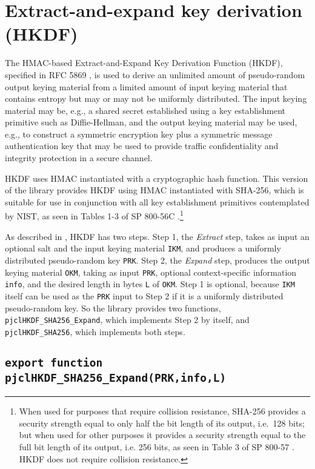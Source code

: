 \documentclass[12pt]{article}
\begin{document}
\section{Extract-and-expand key derivation (HKDF)} 

The HMAC-based Extract-and-Expand Key Derivation Function (HKDF),
specified in RFC 5869 \cite{RFC5869}, is used to derive an unlimited amount
of pseudo-random output keying material from a limited amount of input keying material 
that contains entropy but may or may not be uniformly distributed.  
The input keying material may be, e.g., a shared secret established using a key establishment
primitive such as Diffie-Hellman, and the output keying material may be used, e.g., 
to construct a symmetric encryption key plus a symmetric message authentication key
that may be used to provide traffic confidentiality and integrity protection in a secure channel.

HKDF uses HMAC instantiated with a cryptographic hash function.  This version of the library provides
HKDF using HMAC instantiated with SHA-256, which is suitable for use in conjunction with all key establishment primitives
contemplated by NIST, as seen in Tables 1-3 of SP 800-56C \cite{sp800-56C}.\footnote{When
used for purposes that require collision resistance, SHA-256 provides a security strength 
equal to only half the bit length of its output, i.e.\ 128 bits; but when used for other purposes it
provides a security strength equal to the full bit length of its output, i.e. 256 bits, as seen in 
Table 3 of SP 800-57 \cite{sp800-57part1rev4}.  HKDF 
does not require collision resistance.}

As described in \cite{RFC5869}, HKDF has two steps.  Step 1, the {\em Extract\/} step, takes
as input an optional salt and the input keying material {\tt IKM}, and produces a 
uniformly distributed pseudo-random key {\tt PRK}.  Step 2, the {\em Expand\/} step, 
produces the output keying material {\tt OKM}, taking
as input {\tt PRK}, optional context-specific information {\tt info}, and the desired 
length in bytes {\tt L} of {\tt OKM}.  
Step 1 is optional, because {\tt IKM} itself can be used as the {\tt PRK} input to Step 2
if it is a uniformly distributed pseudo-random key.  So the library provides two functions,
{\tt pjclHKDF\_SHA256\_Expand}, which implements Step 2 by itself, and {\tt pjclHKDF\_SHA256}, which
implements both steps.

\subsection{\tt export function pjclHKDF\_SHA256\_Expand(PRK,info,L)}
\end{document}
